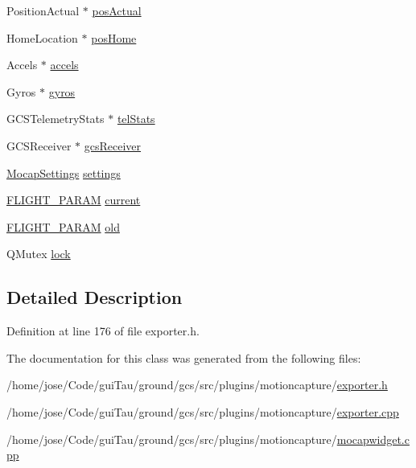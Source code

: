 \begin{DoxyCompactItemize}
Position\-Actual $\ast$ \hyperlink{group___mo_cap_plugin_ga48e371afeb39f31ab368d804798313f5}{pos\-Actual}
\item 
Home\-Location $\ast$ \hyperlink{group___mo_cap_plugin_ga9a7c0ada8bbd6bf8c95ca54f123befbe}{pos\-Home}
\item 
Accels $\ast$ \hyperlink{group___mo_cap_plugin_ga4dd5a6587431c70720881c0540f065c9}{accels}
\item 
Gyros $\ast$ \hyperlink{group___mo_cap_plugin_ga2b6042b4adabe6985d92cc22f33cfc9a}{gyros}
\item 
G\-C\-S\-Telemetry\-Stats $\ast$ \hyperlink{group___mo_cap_plugin_gad3a5a6122f88f8f4b44847053a7d830b}{tel\-Stats}
\item 
G\-C\-S\-Receiver $\ast$ \hyperlink{group___mo_cap_plugin_ga49b2f0b0762b95f0da3f7c4a7330b941}{gcs\-Receiver}
\item 
\hyperlink{group___mo_cap_plugin_ga6083347a5b3eb70e360f599354dc0f0b}{Mocap\-Settings} \hyperlink{group___mo_cap_plugin_ga50484fe9f9410948c133b1c589f73f76}{settings}
\item 
\hyperlink{group___h_i_t_l_plugin_ga7bda7a22b899fe8dff0ba9a0cae99da6}{F\-L\-I\-G\-H\-T\-\_\-\-P\-A\-R\-A\-M} \hyperlink{group___mo_cap_plugin_ga6c17ed61598da30f012113ffbff26816}{current}
\item 
\hyperlink{group___h_i_t_l_plugin_ga7bda7a22b899fe8dff0ba9a0cae99da6}{F\-L\-I\-G\-H\-T\-\_\-\-P\-A\-R\-A\-M} \hyperlink{group___mo_cap_plugin_ga5ef84da1bd9cf4e1d625c33beb5a148c}{old}
\item 
Q\-Mutex \hyperlink{group___mo_cap_plugin_ga55a5f9c6eb2d80cfc96523f4592f5417}{lock}
\end{DoxyCompactItemize}


\subsection{Detailed Description}


Definition at line 176 of file exporter.\-h.



The documentation for this class was generated from the following files\-:\begin{DoxyCompactItemize}
\item 
/home/jose/\-Code/gui\-Tau/ground/gcs/src/plugins/motioncapture/\hyperlink{exporter_8h}{exporter.\-h}\item 
/home/jose/\-Code/gui\-Tau/ground/gcs/src/plugins/motioncapture/\hyperlink{exporter_8cpp}{exporter.\-cpp}\item 
/home/jose/\-Code/gui\-Tau/ground/gcs/src/plugins/motioncapture/\hyperlink{mocapwidget_8cpp}{mocapwidget.\-cpp}\end{DoxyCompactItemize}
